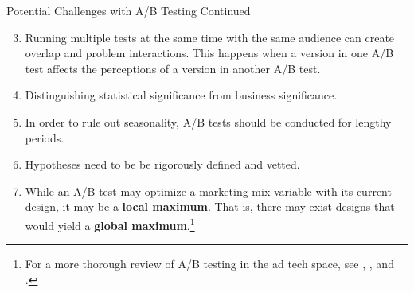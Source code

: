 \documentclass[pdf]{beamer}
\newcommand{\empr}[1]{{\color{franklinblue}\textbf{#1}}}
\theoremstyle{remark}
\theoremstyle{definition}
\begin{document}
\begin{frame}[t]{Potential Challenges with A/B Testing Continued}
\small
\begin{enumerate}
  \setcounter{enumi}{2}
\item Running multiple tests at the same time with the same audience can create overlap and problem interactions. This happens when a version in one A/B test affects the perceptions of a version in another A/B test.
\item Distinguishing statistical significance from business significance. 
\item In order to rule out seasonality, A/B tests should be conducted for lengthy periods.
\item Hypotheses need to be be rigorously defined and vetted. 
\item While an A/B test may optimize a marketing mix variable with its current design, it may be a \empr{local maximum}. That is, there may exist designs that would yield a \empr{global maximum}.\footnote{For a more thorough review of A/B testing in the ad tech space, see \cite{kohavi2009},  \cite{kohavi2011}, and \cite{kohavi2017}.} 
\end{enumerate}
\end{frame}
\end{document}
